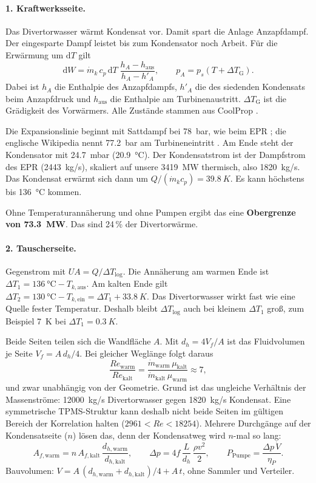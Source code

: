 \documentclass[10pt,a4paper]{article}
\begin{document}
\paragraph{1. Kraftwerksseite.} Das Divertorwasser wärmt Kondensat vor. Damit spart die Anlage Anzapfdampf. Der
eingesparte Dampf leistet bis zum Kondensator noch Arbeit. Für die Erwärmung um $\mathrm{d}T$ gilt
\[
\mathrm{d}W = \dot m_k\,c_p\,\mathrm{d}T\;\frac{h_A - h_\text{aus}}{h_A - h'_A},\qquad
p_A = p_s(T + \Delta T_\text{G}).
\]
Dabei ist $h_A$ die Enthalpie des Anzapfdampfs, $h'_A$ die des siedenden Kondensats beim Anzapfdruck und
$h_\text{aus}$ die Enthalpie am Turbinenaustritt. $\Delta T_\text{G}$ ist die Grädigkeit des Vorwärmers.
Alle Zustände stammen aus CoolProp \cite{coolprop}.

Die Expansionslinie beginnt mit Sattdampf bei \SI{78}{bar}, wie beim EPR \cite{epr_de}; die englische
Wikipedia nennt \SI{77,2}{bar} am Turbineneintritt \cite{epr_en}. Am Ende steht der Kondensator mit
\SI{24,7}{mbar} (\SI{20,9}{\celsius}). Der Kondensatstrom ist der Dampfstrom des EPR (\SI{2443}{kg/s}),
skaliert auf unsere \SI{3419}{MW} thermisch, also \SI{1820}{kg/s}. Das Kondensat erwärmt sich dann um
$Q/(\dot m_k c_p) = \SI{39,8}{K}$. Es kann höchstens bis \SI{136}{\celsius} kommen.

Ohne Temperaturannäherung und ohne Pumpen ergibt das eine \textbf{Obergrenze von \SI{73,3}{MW}}. Das sind
24\,\% der Divertorwärme.

\paragraph{2. Tauscherseite.} Gegenstrom mit $UA = Q/\Delta T_\text{log}$. Die Annäherung am warmen Ende ist
$\Delta T_1 = \SI{136}{\celsius} - T_{k,\text{aus}}$. Am kalten Ende gilt
$\Delta T_2 = \SI{130}{\celsius} - T_{k,\text{ein}} = \Delta T_1 + \SI{33,8}{K}$. Das Divertorwasser wirkt fast wie eine
Quelle fester Temperatur. Deshalb bleibt $\Delta T_\text{log}$ auch bei kleinem $\Delta T_1$ groß, zum Beispiel
\SI{7}{K} bei $\Delta T_1 = \SI{0,3}{K}$.

Beide Seiten teilen sich die Wandfläche $A$. Mit $d_h = 4V_f/A$ ist das Fluidvolumen je Seite $V_f = A\,d_h/4$.
Bei gleicher Weglänge folgt daraus
\[
\frac{\mathit{Re}_\text{warm}}{\mathit{Re}_\text{kalt}} = \frac{\dot m_\text{warm}\,\mu_\text{kalt}}{\dot m_\text{kalt}\,\mu_\text{warm}} \approx 7,
\]
und zwar unabhängig von der Geometrie. Grund ist das ungleiche Verhältnis der Massenströme:
\SI{12000}{kg/s} Divertorwasser gegen \SI{1820}{kg/s} Kondensat. Eine symmetrische TPMS-Struktur kann deshalb nicht
beide Seiten im gültigen Bereich der Korrelation halten ($2961 < \mathit{Re} < 18254$). Mehrere Durchgänge auf der
Kondensatseite ($n$) lösen das, denn der Kondensatweg wird $n$-mal so lang:
\[
A_{f,\text{warm}} = n\,A_{f,\text{kalt}}\,\frac{d_{h,\text{warm}}}{d_{h,\text{kalt}}},\qquad
\Delta p = 4f\,\frac{L}{d_h}\,\frac{\rho v^2}{2},\qquad P_\text{Pumpe} = \frac{\Delta p\,\dot V}{\eta_P}.
\]
Bauvolumen: $V = A\,(d_{h,\text{warm}} + d_{h,\text{kalt}})/4 + A\,t$, ohne Sammler und Verteiler.
\end{document}
